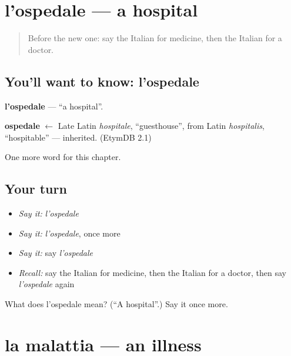 \section[l'ospedale]{l'ospedale — a hospital}

\label{lesson:IT-C41-ospedale}



\begin{quote}
Before the new one: say the Italian for medicine, then the Italian for a doctor.
\end{quote}

\subsection*{You'll want to know: l'ospedale}
\textbf{l'ospedale} — \textquotedblleft{}a hospital\textquotedblright{}.

\begin{cousinweb}
\textbf{ospedale} $\leftarrow$ Late Latin \emph{hospitale}, \textquotedblleft{}guesthouse\textquotedblright{}, from Latin \emph{hospitalis}, \textquotedblleft{}hospitable\textquotedblright{} — inherited. (EtymDB 2.1)
\end{cousinweb}

\begin{grammarlens}[title={What you've built}]
One more word for this chapter.
\end{grammarlens}

\subsection*{Your turn}
\begin{itemize}
\raggedright
  \item \emph{Say it:} \emph{l'ospedale}
  \item \emph{Say it:} \emph{l'ospedale}, once more
  \item \emph{Say it:} say \emph{l'ospedale}
  \item \emph{Recall:} say the Italian for medicine, then the Italian for a doctor, then say \emph{l'ospedale} again
\end{itemize}

\begin{tcolorbox}[breakable,colback=teal!4,colframe=teal!35!black,title={Before you move on}]
What does l'ospedale mean? (\textquotedblleft{}A hospital\textquotedblright{}.) Say it once more.
\end{tcolorbox}
\section[la malattia]{la malattia — an illness}

